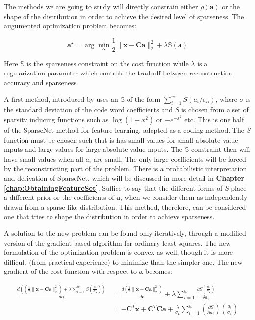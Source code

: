 \documentclass[12pt,a4paper,oneside,english]{UPBThesis}
\begin{document}
The methods we are going to study will directly constrain either $\rho(\textbf{a})$ or the shape of the distribution in order to achieve the desired level of sparseness. The augumented optimization problem becomes:

\begin{equation*}
\textbf{a}^{\star} = \arg\min_{\textbf{a}} \frac{1}{2} \| \textbf{x} - \textbf{C}\textbf{a} \|_2^2 + \lambda \mathbb{S}(\textbf{a})
\end{equation*}

Here $\mathbb{S}$ is the sparseness constraint on the cost function while $\lambda$ is a regularization parameter which controls the tradeoff between reconstruction accuracy and sparseness.

A first method, introduced by \cite{emergence-sparse-coding} uses an $\mathbb{S}$ of the form $\sum_{i=1}^w{S(a_i / \sigma_{\textbf{a}})}$, where $\sigma$ is the standard deviation of the code word coefficients and $S$ is chosen from a set of sparsity inducing functions such as $\log(1 + x^2)$ or $-e^{-x^2}$ etc. This is one half of the SparseNet method for feature learning, adapted as a coding method. The $S$ function must be chosen such that is has small values for small absolute value inputs and large values for large absolute value inputs. The $\mathbb{S}$ constraint then will have small values when all $a_i$ are small. The only large coefficients will be forced by the reconstructing part of the problem. There is a probabilistic interpretation and derivation of SparseNet, which will be discussed in more detail in \textbf{Chapter \ref{chap:ObtainingFeatureSet}}. Suffice to say that the different forms of $S$ place a different prior or the coefficients of $\textbf{a}$, when we consider them as independently drawn from a sparse-like distribution. This method, therefore, can be considered one that tries to shape the distribution in order to achieve sparseness.

A solution to the new problem can be found only iteratively, through a modified version of the gradient based algorithm for ordinary least squares. The new formulation of the optimization problem is convex as well, though it is more difficult (from practical experience) to minimize than the simpler one. The new gradient of the cost function with respect to $\textbf{a}$ becomes:

\begin{align*}
\frac{d \left( \left( \frac{1}{2}\|\textbf{x} - \textbf{C}\textbf{a}\|_2^2 \right) + \lambda\sum_{i=1}^{w}{S(\frac{a_i}{\sigma_{\textbf{a}}})} \right)}{d\textbf{a}} & = \frac{d \left( \frac{1}{2}\|\textbf{x} - \textbf{C}\textbf{a}\|_2^2 \right)}{d\textbf{a}} + \lambda\sum_{i=1}^{w}\frac{\partial S(\frac{a_i}{\sigma_{\textbf{a}}})}{\partial a_i} \\
& = -\textbf{C}^T\textbf{x} + \textbf{C}^T\textbf{C}\textbf{a} + \frac{\lambda}{\sigma_{\textbf{a}}} \sum_{i=1}^{w} {\left( \frac{\partial S}{\partial a_i} \right) \left( \frac{a_i}{\sigma_{\textbf{a}}} \right)}
\end{align*}
\end{document}
